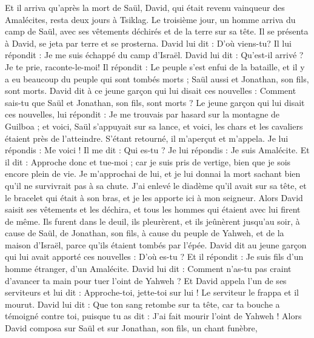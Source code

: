 \begin{multicols}{2}
\VerseOne{}Et il arriva qu’après la mort de Saül, David, qui était revenu vainqueur des Amalécites, resta deux jours à Tsiklag.
Le troisième jour, un homme arriva du camp de Saül, avec ses vêtements déchirés et de la terre sur sa tête. Il se présenta à David, se jeta par terre et se prosterna.
David lui dit : D'où viens-tu? Il lui répondit : Je me suis échappé du camp d'Israël.
David lui dit : Qu'est-il arrivé ? Je te prie, raconte-le-moi! Il répondit : Le peuple s'est enfui de la bataille, et il y a eu beaucoup du peuple qui sont tombés morts ; Saül aussi et Jonathan, son fils, sont morts.
David dit à ce jeune garçon qui lui disait ces nouvelles : Comment sais-tu que Saül et Jonathan, son fils, sont morts ?
Le jeune garçon qui lui disait ces nouvelles, lui répondit : Je me trouvais par hasard sur la montagne de Guilboa ; et voici, Saül s’appuyait sur sa lance, et voici, les chars et les cavaliers étaient près de l’atteindre.
S’étant retourné, il m’aperçut et m'appela. Je lui répondis : Me voici !
Il me dit : Qui es-tu ? Je lui répondis : Je suis Amalécite.
Et il dit : Approche donc et tue-moi ; car je suis pris de vertige, bien que je sois encore plein de vie.
Je m’approchai de lui, et je lui donnai la mort sachant bien qu'il ne survivrait pas à sa chute. J'ai enlevé le diadème qu'il avait sur sa tête, et le bracelet qui était à son bras, et je les apporte ici à mon seigneur.
Alors David saisit ses vêtements et les déchira, et tous les hommes qui étaient avec lui firent de même.
Ils furent dans le deuil, ils pleurèrent, et ils jeûnèrent jusqu'au soir, à cause de Saül, de Jonathan, son fils, à cause du peuple de Yahweh, et de la maison d'Israël, parce qu'ils étaient tombés par l'épée.
David dit au jeune garçon qui lui avait apporté ces nouvelles : D'où es-tu ? Et il répondit : Je suis fils d'un homme étranger, d’un Amalécite.
David lui dit : Comment n'as-tu pas craint d'avancer ta main pour tuer l’oint de Yahweh ?
Et David appela l'un de ses serviteurs et lui dit : Approche-toi, jette-toi sur lui ! Le serviteur le frappa et il mourut.
David lui dit : Que ton sang retombe sur ta tête, car ta bouche a témoigné contre toi, puisque tu as dit : J'ai fait mourir l’oint de Yahweh !
Alors David composa sur Saül et sur Jonathan, son fils, un chant funèbre,

\end{multicols}
